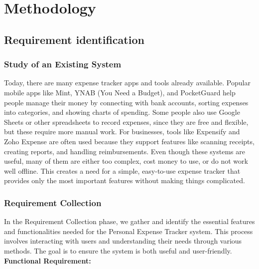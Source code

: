 \documentclass[12pt]{report} %
\begin{document}
\newpage

\chapter{Methodology}

\section{Requirement identification}

\subsection{Study of an Existing System}
Today, there are many expense tracker apps and tools already available. Popular mobile apps like Mint, YNAB (You Need a Budget), and PocketGuard help people manage their money by connecting with bank accounts, sorting expenses into categories, and showing charts of spending. Some people also use Google Sheets or other spreadsheets to record expenses, since they are free and flexible, but these require more manual work. For businesses, tools like Expensify and Zoho Expense are often used because they support features like scanning receipts, creating reports, and handling reimbursements. Even though these systems are useful, many of them are either too complex, cost money to use, or do not work well offline. This creates a need for a simple, easy-to-use expense tracker that provides only the most important features without making things complicated.

\subsection{Requirement Collection}
In the Requirement Collection phase, we gather and identify the essential features and functionalities needed for the Personal Expense Tracker system. This process involves interacting with users and understanding their needs through various methods. The goal is to ensure the system is both useful and user-friendly. \\[3mm]
\newpage
\noindent
\textbf{Functional Requirement:}
\end{document}

